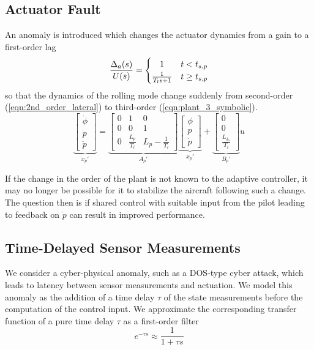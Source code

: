 \subsection{Actuator Fault}
An anomaly is introduced which changes the actuator dynamics from a gain to a first-order lag
\begin{equation}
	\frac{\Delta_a(s)}{U(s)} = \begin{cases}
		\hfil 1 & t < t_{s,p}\\
		\frac{1}{T_l s + 1} & t \geq t_{s,p}
	\end{cases} 
	\label{eqn:actuator_dynamics_symbolic}
\end{equation} 
\noindent so that the dynamics of the rolling mode change suddenly from second-order (\ref{eqn:2nd_order_lateral}) to third-order (\ref{eqn:plant_3_symbolic}).
\begin{equation}
	\underbrace{\begin{bmatrix}
		\dot{\phi} \\ \dot{p} \\ \ddot{p}
	\end{bmatrix}}_{\dot{x}_p'} = \underbrace{\begin{bmatrix}
		0 & 1 & 0\\ 0 & 0 & 1 \\ 0 & \frac{L_p}{T_l} & L_p - \frac{1}{T_l}
	\end{bmatrix}}_{A_p'} \underbrace{\begin{bmatrix}
		\phi \\ p \\ \dot{p}
	\end{bmatrix}}_{x_p'} + \underbrace{\begin{bmatrix}
		0 \\ 0 \\ \frac{L_{\delta_a}}{T_l}
	\end{bmatrix}}_{B_p'} u
	\label{eqn:plant_3_symbolic}
\end{equation}

If the change in the order of the plant is not known to the adaptive controller, it may no longer be possible for it to stabilize the aircraft following such a change. The question then is if shared control with suitable input from the pilot leading to feedback on $\dot{p}$ can result in improved performance.

\subsection{Time-Delayed Sensor Measurements}
We consider a cyber-physical anomaly, such as a DOS-type cyber attack, which leads to latency between sensor measurements and actuation. We model this anomaly as the addition of a time delay $\tau$ of the state measurements before the computation of the control input. We approximate the corresponding transfer function of a pure time delay $\tau$ as a first-order filter
\begin{equation}
	e^{-\tau s} \approx \frac{1}{1 + \tau s}
	\label{first_order_delay_approx}
\end{equation}

